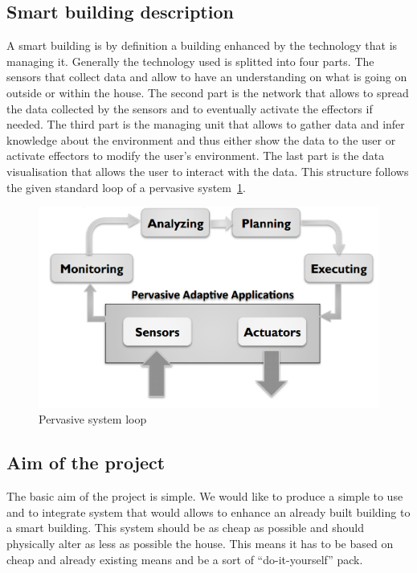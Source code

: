 \documentclass{acm_proc_article-sp}
\begin{document}
\subsection{Smart building description}
A smart building is by definition a building enhanced by the technology that is managing it. 
Generally the technology used is splitted into four parts. 
The sensors that collect data and allow to have an understanding on what is going on outside or within the house. 
The second part is the network that allows to spread the data collected by the sensors and to eventually activate the effectors if needed. 
The third part is the managing unit that allows to gather data and infer knowledge about the environment and thus either show the data to the user or activate effectors to modify the user’s environment. 
The last part is the data visualisation that allows the user to interact with the data.
This structure follows the given standard loop of a pervasive system~\ref{loop}.
				\begin{figure}[htb]
				\begin{center}
				\includegraphics[width=\linewidth]{loop}
				\caption{Pervasive system loop \label{loop}}
				\end{center}
				\end{figure}


\subsection{Aim of the project}
The basic aim of the project is simple.
We would like to produce a simple to use and to integrate system that would allows to enhance an already built building to a smart building. 
This system should be as cheap as possible and should physically alter as less as possible the house. 
This means it has to be based on cheap and already existing means and be a sort of “do-it-yourself” pack.
\end{document}
